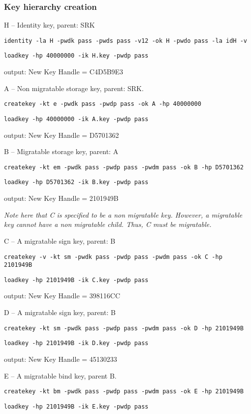 \documentclass[10pt]{article}
\newcommand{\command}[1]{\texttt{#1}}
\begin{document}
    \subsubsection{Key hierarchy creation}

    H -- Identity key, parent: SRK

    \command{identity -la H -pwdk pass -pwds pass -v12 -ok H -pwdo pass -la idH -v}

    \command{loadkey -hp 40000000 -ik H.key -pwdp pass}

    output: New Key Handle = C4D5B9E3

    A -- Non migratable storage key, parent: SRK.

    \command{createkey -kt e -pwdk pass -pwdp pass -ok A -hp 40000000}

    \command{loadkey -hp 40000000 -ik A.key -pwdp pass}

    output: New Key Handle = D5701362

    B -- Migratable storage key, parent: A

    \command{createkey -kt em -pwdk pass -pwdp pass -pwdm pass -ok B -hp D5701362}

    \command{loadkey -hp D5701362 -ik B.key -pwdp pass}

    output: New Key Handle = 2101949B
   
    \textit{Note here that C is specified to be a non migratable key.
    However, a migratable key cannot have a non migratable child.
    Thus, C must be migratable.}

    C -- A migratable sign key, parent: B

    \command{createkey -v -kt sm -pwdk pass -pwdp pass -pwdm pass -ok C -hp 2101949B}

    \command{loadkey -hp 2101949B -ik C.key -pwdp pass}

    output: New Key Handle = 398116CC

    D -- A migratable sign key, parent: B

    \command{createkey -kt sm -pwdk pass -pwdp pass -pwdm pass -ok D -hp 2101949B}

    \command{loadkey -hp 2101949B -ik D.key -pwdp pass}

    output: New Key Handle = 45130233

    E -- A migratable bind key, parent B.

    \command{createkey -kt bm -pwdk pass -pwdp pass -pwdm pass -ok E -hp 2101949B}

    \command{loadkey -hp 2101949B -ik E.key -pwdp pass}
\end{document}
